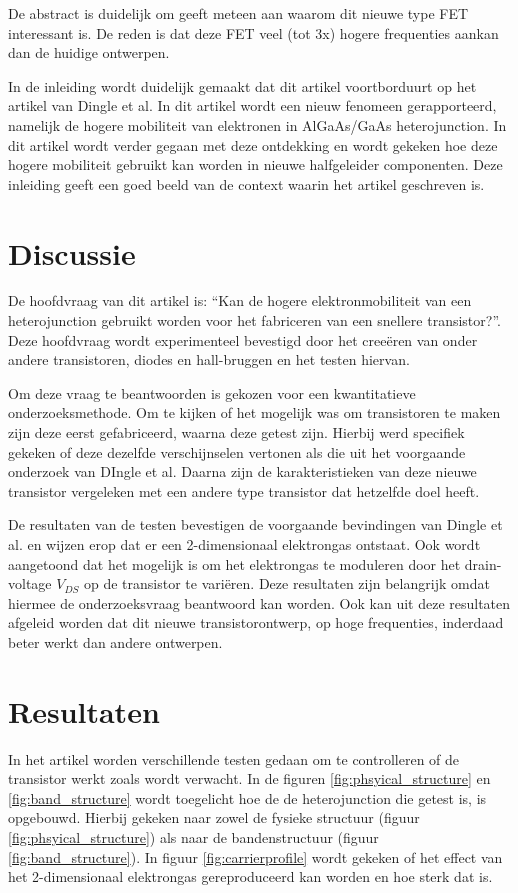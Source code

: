 \documentclass[11pt]{article}
\begin{document}
De abstract is duidelijk om geeft meteen aan waarom dit nieuwe type FET interessant is. De reden is dat deze FET veel (tot 3x) hogere frequenties aankan dan de huidige ontwerpen. 

In de inleiding wordt duidelijk gemaakt dat dit artikel voortborduurt op het artikel van Dingle et al. In dit artikel wordt een nieuw fenomeen gerapporteerd, namelijk de hogere mobiliteit van elektronen in AlGaAs/GaAs heterojunction. In dit artikel wordt verder gegaan met deze ontdekking en wordt gekeken hoe deze hogere mobiliteit gebruikt kan worden in nieuwe halfgeleider componenten. Deze inleiding geeft een goed beeld van de context waarin het artikel geschreven is.

\section{Discussie}
De hoofdvraag van dit artikel is: ``Kan de hogere elektronmobiliteit van een heterojunction gebruikt worden voor het fabriceren van een snellere transistor?''. Deze hoofdvraag wordt experimenteel bevestigd door het cree\"eren van onder andere transistoren, diodes en hall-bruggen en het testen hiervan.

Om deze vraag te beantwoorden is gekozen voor een kwantitatieve onderzoeksmethode. Om te kijken of het mogelijk was om transistoren te maken zijn deze eerst gefabriceerd, waarna deze getest zijn. Hierbij werd specifiek gekeken of deze dezelfde verschijnselen vertonen als die uit het voorgaande onderzoek van DIngle et al. Daarna zijn de karakteristieken van deze nieuwe transistor vergeleken met een andere type transistor dat hetzelfde doel heeft.

De resultaten van de testen bevestigen de voorgaande bevindingen van Dingle et al. en wijzen erop dat er een 2-dimensionaal elektrongas ontstaat. Ook wordt aangetoond dat het mogelijk is om het elektrongas te moduleren door het drain-voltage $V_{DS}$ op de transistor te vari\"eren. Deze resultaten zijn belangrijk omdat hiermee de onderzoeksvraag beantwoord kan worden. Ook kan uit deze resultaten afgeleid worden dat dit nieuwe transistorontwerp, op hoge frequenties, inderdaad beter werkt dan andere ontwerpen.

\newpage

\section{Resultaten}
In het artikel worden verschillende testen gedaan om te controlleren of de transistor werkt zoals wordt verwacht. In de figuren \ref{fig:phsyical_structure} en \ref{fig:band_structure} wordt toegelicht hoe de de heterojunction die getest is, is opgebouwd. Hierbij gekeken naar zowel de fysieke structuur (figuur \ref{fig:phsyical_structure}) als naar de bandenstructuur (figuur \ref{fig:band_structure}).
In figuur \ref{fig:carrierprofile} wordt gekeken of het effect van het 2-dimensionaal elektrongas gereproduceerd kan worden en hoe sterk dat is.
\end{document}
